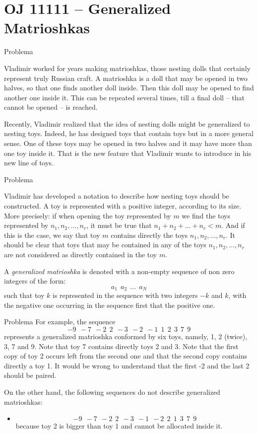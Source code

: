 \section{OJ 11111 -- Generalized Matrioshkas}

\begin{frame}[fragile]{Problema}

Vladimir worked for years making matrioshkas, those nesting dolls that certainly represent truly 
Russian craft. A matrioshka is a doll that may be opened in two halves, so that one finds another 
doll inside.  Then this doll may be opened to find another one inside it. This can be repeated 
several times, till a final doll -- that cannot be opened -- is reached.

Recently, Vladimir realized that the idea of nesting dolls might be generalized to nesting toys.
Indeed, he has designed toys that contain toys but in a more general sense. One of these toys may
be opened in two halves and it may have more than one toy inside it. That is the new feature that
Vladimir wants to introduce in his new line of toys.
\end{frame}

\begin{frame}[fragile]{Problema}

Vladimir has developed a notation to describe how nesting toys should be constructed. A toy
is represented with a positive integer, according to its size. More precisely: if when opening the 
toy represented by $m$ we find the toys represented by $n_1, n_2, \ldots, n_r$, it must be true 
that $n_1+n_2+. . .+n_r < m$. And if this is the case, we say that toy $m$ contains directly the 
toys $n_1, n_2, \ldots, n_r$. It should be clear that toys that may be contained in any of the toys 
$n_1, n_2, \ldots, n_r$ are not considered as directly contained in the toy $m$.

A \textit{generalized matrioshka} is denoted with a non-empty sequence of non zero integers of the 
form:
\[
a_1\ \ a_2\ \ \ldots\ \ a_N
\]
such that toy $k$ is represented in the sequence with two integers $-k$ and $k$, with the negative 
one occurring in the sequence first that the positive one.

\end{frame}

\begin{frame}[fragile]{Problema}
For example, the sequence
\[
-9\ \ -7\ \ -2\ \ 2\ \ -3\ \ -2\ \ -1\ \ 1\ \ 2\ \ 3\ \ 7\ \ 9
\]
represents a generalized matrioshka conformed by six toys, namely, 1, 2 (twice), 3, 7 and 9. 
Note that toy 7 contains directly toys 2 and 3. Note that the first copy of toy 2 occurs left 
from the second one and that the second copy contains directly a toy 1. It would be wrong to 
understand that the first -2 and the last 2 should be paired.

On the other hand, the following sequences do not describe generalized matrioshkas:
\begin{itemize}
\item
\[
-9\ \ -7\ \ -2\ \ 2\ \ -3\ \ -1\ \ -2\ \ 2\ \ 1\ \ 3\ \ 7\ \ 9
\]
because toy 2 is bigger than toy 1 and cannot be allocated inside it.
\end{itemize}
\end{frame}

